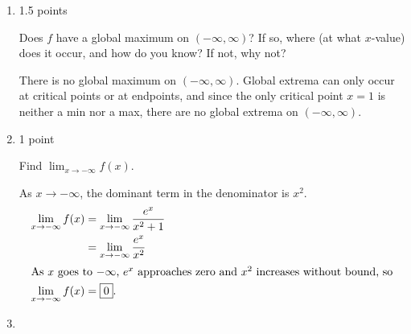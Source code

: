 \documentclass{article}
\begin{document}
\begin{enumerate}
\begin{enumerate}
    \begin{solution}
      The Extreme Value Theorem guarantees that $f$ will have a global maximum on $[-2, 2]$.
      Since $f$ is always increasing, the maximum has to occur at $x=2$.
    \end{solution}

  \item

    \begin{grading}
      1.5 points
    \end{grading}

    \begin{problem}[\stretch{0.5}]
      Does $f$ have a global maximum on $(-\infty, \infty)$? If so, where (at what $x$-value) does it occur, and how do you know? If not, why not?
    \end{problem}

    \begin{solution}
      There is no global maximum on $(-\infty, \infty)$. Global extrema can only occur
      at critical points or at endpoints, and since the only critical point $x=1$ is
      neither a min nor a max, there are no global extrema on $(-\infty, \infty)$.
    \end{solution}

  \item

    \begin{grading}
      1 point
    \end{grading}

    \begin{problem}[1in]
      Find $\displaystyle \lim_{x \to -\infty} f(x)$. 
    \end{problem}

    \begin{solution}
      As $x \to -\infty$, the dominant term in the denominator is $x^2$.
      \begin{align*}
        \lim_{x \to -\infty} f(x) &= \lim_{x \to -\infty} \frac{e^x}{x^2+1} \\
        &= \lim_{x \to -\infty} \frac{e^x}{x^2} \\
        \intertext{As $x$ goes to $-\infty$, $e^x$ approaches zero and $x^2$ increases
        without bound, so}
        \lim_{x \to -\infty} f(x) &= \boxed{0}.
      \end{align*}
    \end{solution}

  \item


\end{enumerate}
\end{enumerate}
\end{document}
